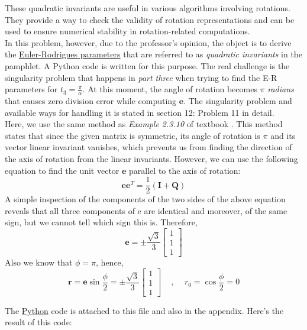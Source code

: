 \documentclass[conference]{IEEEtran}
\begin{document}
These quadratic invariants are useful in various algorithms involving rotations. They provide a way to check the validity of rotation representations and can be used to ensure numerical stability in rotation-related computations. \\
In this problem, however, due to the professor's opinion, the object is to derive the \underline{Euler-Rodrigues parameters} that are referred to as \textit{quadratic invariants} in the pamphlet. A Python code is written for this purpose. The real challenge is the singularity problem that happens in \textit{part three} when trying to find the E-R parameters for \(t_3=\frac{\pi}{\alpha}\). At this moment, the angle of rotation becomes \(\pi \) \textit{radians} that causes zero division error while computing \(\mathbf{e}\). The singularity problem and available ways for handling it is stated in section 12: Problem 11 in detail. \\
Here, we use the same method as \textit{Example 2.3.10} of textbook \cite{b1}. This method states that since the given matrix is symmetric, its angle of rotation is $\pi$ and its vector linear invariant vanishes, which prevents us from finding the direction of the axis of rotation from the linear invariants. However, we can use the following equation to find the unit vector $\textbf{e}$ parallel to the axis of rotation:
$$
\mathbf{e} \mathbf{e}^T = \frac{1}{2} (\mathbf{I}+\mathbf{Q})
$$
A simple inspection of the components of the two sides of the above equation reveals that all three components of e are identical and moreover, of the same sign, but we cannot tell which sign this is. Therefore,
$$
\mathbf{e} = \pm \frac{\sqrt{3}}{3} 
\begin{bmatrix}
    1\\
    1\\
    1
\end{bmatrix}
$$
Also we know that $\phi = \pi$, hence,
$$
\textbf{r} = \textbf{e} \sin \frac{\phi}{2} = \pm \frac{\sqrt{3}}{3} 
\begin{bmatrix}
    1\\
    1\\
    1
\end{bmatrix} \, \quad , \quad \, r_0 = \cos \frac{\phi}{2} = 0
$$

The \underline{Python} code is attached to this file and also in the appendix. Here's the result of this code:
\end{document}
